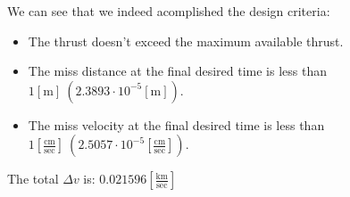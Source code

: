 \documentclass[11pt, a4paper]{article}
\begin{document}
We can see that we indeed acomplished the design criteria:
\begin{itemize}
    \item The thrust doesn't exceed the maximum available thrust.
    \item The miss distance at the final desired time is less than $1[\mathrm{m}]\ \left(2.3893\cdot10^{-5}\left[\mathrm{m}\right]\right)$.
    \item The miss velocity at the final desired time is less than $1\left[\displaystyle\frac{\mathrm{cm}}{\mathrm{sec}}\right]\ \left(2.5057\cdot10^{-5}\left[\displaystyle\frac{\mathrm{cm}}{\mathrm{sec}}\right]\right)$.
\end{itemize}

The total $\Delta v$ is: $0.021596\left[\displaystyle\frac{\mathrm{km}}{\mathrm{sec}}\right]$
\newpage
\end{document}
